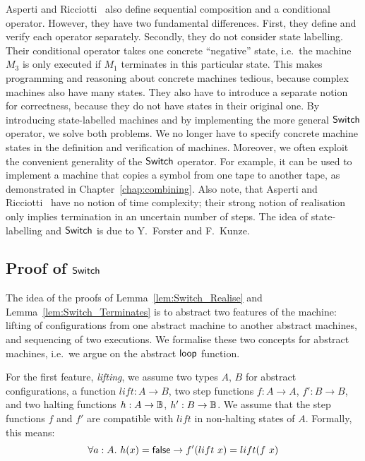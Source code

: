 Asperti and Ricciotti~\cite{asperti2015} also define sequential composition and a conditional operator.  However, they have two fundamental
differences.  First, they define and verify each operator separately.  Secondly, they do not consider state labelling.  Their conditional operator
takes one concrete ``negative'' state, i.e.\ the machine $M_3$ is only executed if $M_1$ terminates in this particular state.  This makes programming
and reasoning about concrete machines tedious, because complex machines also have many states.  They also have to introduce a separate notion for
correctness, because they do not have states in their original one.  By introducing state-labelled machines and by implementing the more general
$\mathsf{Switch}$ operator, we solve both problems.  We no longer have to specify concrete machine states in the definition and verification of machines.
Moreover, we often exploit the convenient generality of the $\mathsf{Switch}$ operator.  For example, it can be used to implement a machine that copies a
symbol from one tape to another tape, as demonstrated in Chapter~\ref{chap:combining}.  Also note, that Asperti and Ricciotti~\cite{asperti2015} have
no notion of time complexity; their strong notion of realisation only implies termination in an uncertain number of steps.  The idea of
state-labelling and $\mathsf{Switch}$ is due to Y.~Forster and F.~Kunze.


\subsection{Proof of $\mathsf{Switch}$}
\label{sec:match-proofs}


The idea of the proofs of Lemma~\ref{lem:Switch_Realise} and Lemma~\ref{lem:Switch_Terminates} is to abstract two features of the machine: lifting of
configurations from one abstract machine to another abstract machines, and sequencing of two executions.  We formalise these two concepts for abstract
machines, i.e.\ we argue on the abstract $\mathsf{loop}$ function.

For the first feature, \textit{lifting}, we assume two types $A$, $B$ for abstract configurations, a function $lift : A \to B$, two step functions
$f : A \to A$, $f' : B \to B$, and two halting functions $h : A \rightarrow \mathbb{B}$, $h' : B \rightarrow \mathbb{B}$.  We assume that the step functions $f$ and $f'$ are
compatible with $lift$ in non-halting states of $A$.  Formally, this means:
\begin{equation}
  \label{eq:loop_lift_assumption1}
  \forall a:A.~ h(x)=\mathsf{false} \rightarrow f' (lift~x) = lift (f~x)
\end{equation}

